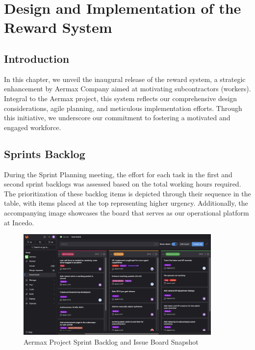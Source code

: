 \chapter{Design and Implementation of the Reward System}
\minitoc
\newpage

\setcounter{secnumdepth}{0} %
\section{Introduction}

In this chapter, we unveil the inaugural release of the reward system, a strategic enhancement by Aermax Company aimed at motivating subcontractors (workers). Integral to the Aermax project, this system reflects our comprehensive design considerations, agile planning, and meticulous implementation efforts. Through this initiative, we underscore our commitment to fostering a motivated and engaged workforce.

\section{Sprints Backlog}
During the Sprint Planning meeting, the effort for each task in the first and second sprint backlogs was assessed based on the total working hours required. The prioritization of these backlog items is depicted through their sequence in the table, with items placed at the top representing higher urgency. Additionally, the accompanying image showcases the board that serves as our operational platform at Incedo.

 \begin{figure}[H]
    \centering
    \includegraphics[width=0.9\textwidth]{src/assets/chapters/reward-system-backloog.png}
    \caption{Aermax Project Sprint Backlog and Issue Board Snapshot}
    \label{fig:sprint_backlog_and_issue_board}
\end{figure}

